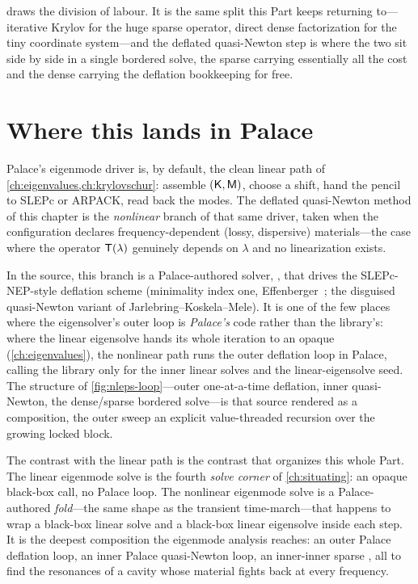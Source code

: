  draws the division of labour. It is the same split
this Part keeps returning to---iterative Krylov for the huge sparse operator,
direct dense factorization for the tiny coordinate system---and the deflated
quasi-Newton step is where the two sit side by side in a single bordered solve, the
sparse  carrying essentially all the cost and the dense
 carrying the deflation bookkeeping for free.

\section{Where this lands in Palace}
\label{sec:def-palace}

Palace's eigenmode driver is, by default, the clean linear path of
\cref{ch:eigenvalues,ch:krylovschur}: assemble $(\mathsf{K},\mathsf{M})$, choose a shift,
hand the pencil to SLEPc or ARPACK, read back the modes. The deflated quasi-Newton
method of this chapter is the \emph{nonlinear} branch of that same driver, taken
when the configuration declares frequency-dependent (lossy, dispersive)
materials---the case where the operator $\mathsf{T}(\lambda)$ genuinely depends on
$\lambda$ and no linearization exists.

In the source, this branch is a Palace-authored solver,
, that drives the SLEPc-NEP-style deflation scheme
(minimality index one, Effenberger~\citep{effenberger2013}; the disguised
quasi-Newton variant of Jarlebring--Koskela--Mele). It is one of the few places
where the eigensolver's outer loop is \emph{Palace's} code rather than the
library's: where the linear eigensolve hands its whole iteration to an opaque
 (\cref{ch:eigenvalues}), the nonlinear path runs the outer
deflation loop in Palace, calling the library only for the inner linear solves and
the linear-eigensolve seed. The structure of \cref{fig:nleps-loop}---outer
one-at-a-time deflation, inner quasi-Newton, the dense/sparse bordered solve---is
that source rendered as a composition, the outer sweep an explicit value-threaded
recursion over the growing locked block.

The contrast with the linear path is the contrast that organizes this whole Part.
The linear eigenmode solve is the fourth \emph{solve corner} of
\cref{ch:situating}: an opaque black-box call, no Palace loop. The nonlinear
eigenmode solve is a Palace-authored \emph{fold}---the same shape as the transient
time-march---that happens to wrap a black-box linear solve and a black-box linear
eigensolve inside each step. It is the deepest composition the eigenmode analysis
reaches: an outer Palace deflation loop, an inner Palace quasi-Newton loop, an
inner-inner sparse , all to find the resonances of a cavity whose
material fights back at every frequency.

